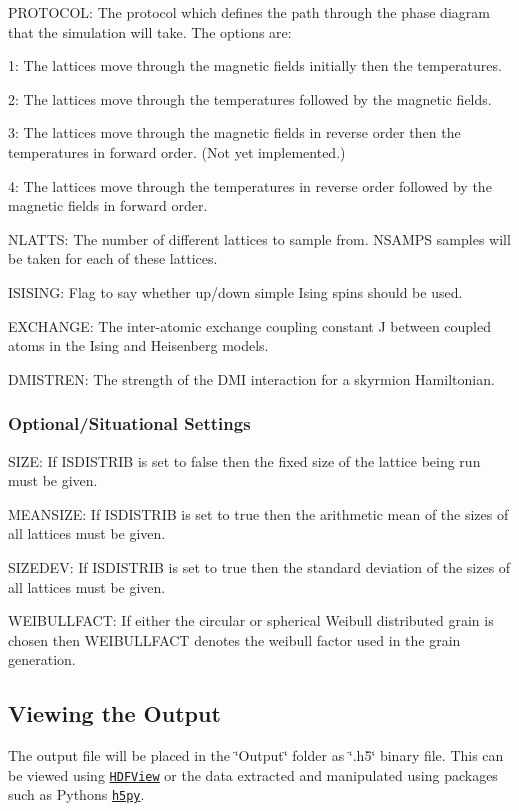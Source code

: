 \begin{DoxyItemize}
\item P\+R\+O\+T\+O\+C\+OL\+: The protocol which defines the path through the phase diagram that the simulation will take. The options are\+:
\begin{DoxyItemize}
\item 1\+: The lattices move through the magnetic fields initially then the temperatures.
\item 2\+: The lattices move through the temperatures followed by the magnetic fields.
\item 3\+: The lattices move through the magnetic fields in reverse order then the temperatures in forward order. (Not yet implemented.)
\item 4\+: The lattices move through the temperatures in reverse order followed by the magnetic fields in forward order.
\end{DoxyItemize}
\item N\+L\+A\+T\+TS\+: The number of different lattices to sample from. N\+S\+A\+M\+PS samples will be taken for each of these lattices.
\item I\+S\+I\+S\+I\+NG\+: Flag to say whether up/down simple Ising spins should be used.
\item E\+X\+C\+H\+A\+N\+GE\+: The inter-\/atomic exchange coupling constant J between coupled atoms in the Ising and Heisenberg models.
\item D\+M\+I\+S\+T\+R\+EN\+: The strength of the D\+MI interaction for a skyrmion Hamiltonian.
\end{DoxyItemize}

\subsubsection*{Optional/\+Situational Settings}


\begin{DoxyItemize}
\item S\+I\+ZE\+: If I\+S\+D\+I\+S\+T\+R\+IB is set to false then the fixed size of the lattice being run must be given.
\item M\+E\+A\+N\+S\+I\+ZE\+: If I\+S\+D\+I\+S\+T\+R\+IB is set to true then the arithmetic mean of the sizes of all lattices must be given.
\item S\+I\+Z\+E\+D\+EV\+: If I\+S\+D\+I\+S\+T\+R\+IB is set to true then the standard deviation of the sizes of all lattices must be given.
\item W\+E\+I\+B\+U\+L\+L\+F\+A\+CT\+: If either the circular or spherical Weibull distributed grain is chosen then W\+E\+I\+B\+U\+L\+L\+F\+A\+CT denotes the weibull factor used in the grain generation.
\end{DoxyItemize}

\subsection*{Viewing the Output}

The output file will be placed in the \char`\"{}\+Output\char`\"{} folder as \char`\"{}.\+h5\char`\"{} binary file. This can be viewed using \href{https://support.hdfgroup.org/products/java/hdfview/}{\tt H\+D\+F\+View} or the data extracted and manipulated using packages such as Python\textquotesingle{}s \href{https://www.h5py.org}{\tt h5py}. 